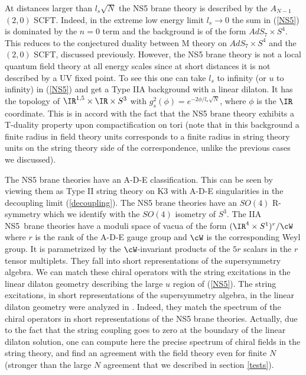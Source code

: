 At distances larger than $l_s\sqrt{N}$ the NS5 brane theory is
described by the $A_{N-1}$ $(2,0)$ SCFT.  Indeed, in the extreme low
energy limit $l_s \rightarrow 0$ the sum in (\ref{NS5}) is dominated
by the $n=0$ term and the background is of the form $AdS_7 \times
S^4$.  This reduces to the conjectured duality between M theory on
$AdS_7 \times S^4$ and the $(2,0)$ SCFT, discussed previously.
However, the NS5 brane theory is not a local quantum field theory at
all energy scales since at short distances it is not described by a UV
fixed point.  To see this one can take $l_s$ to infinity (or $u$ to
infinity) in (\ref{NS5}) and get a Type IIA background with a linear
dilaton.  It has the topology of $\IR^{1,5} \times \IR \times S^3$
with $g_s^2(\phi) = e^{-2\phi/l_s\sqrt{N}}$, where $\phi$ is the $\IR$
coordinate.
This is in accord with the fact that the NS5 brane theory exhibits a
T-duality property upon compactification on tori (note that in this
background a finite radius in field theory units corresponds to a
finite radius in string theory units on the string theory side of the
correspondence, unlike the previous cases we discussed).

The NS5 brane theories have an A-D-E classification. This can be seen
by viewing them as Type II string theory
on K3 with A-D-E singularities in the
decoupling limit (\ref{decoupling}).  The NS5 brane theories have an
$SO(4)$ R-symmetry which we identify with the $SO(4)$ isometry of $S^3$.
The IIA NS5~brane theories have a moduli space of vacua of the form
$(\IR^4 \times S^1)^r/\cW$ where $r$ is the rank of the A-D-E gauge
group and $\cW$ is the corresponding Weyl group.  It is parametrized
by the $\cW$-invariant products of the $5r$ scalars in the $r$ tensor
multiplets.  They fall into short representations of the supersymmetry
algebra.  
We can match these chiral operators with the string excitations in the
linear dilaton geometry describing the large $u$ region of
(\ref{NS5}). The string excitations, in short representations of the
supersymmetry algebra, in the linear dilaton geometry were analyzed in
\cite{Aharony:1998ub}. Indeed, they match the spectrum of the chiral
operators in short representations of the NS5 brane theories. Actually,
due to the fact that the string coupling goes to zero at the boundary
of the linear dilaton solution, one can compute here the precise
spectrum of chiral fields in the string theory, and find an agreement
with the field theory even for finite $N$ (stronger than the large $N$
agreement that we described in section \ref{tests}). 

